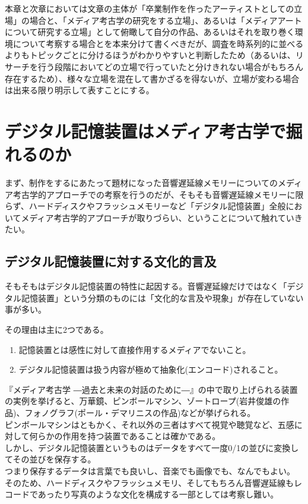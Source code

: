 \documentclass[a4paper,report]{jsbook}
\begin{document}
本章と次章においては文章の主体が「卒業制作を作ったアーティストとしての立場」の場合と、「メディア考古学の研究をする立場」、あるいは「メディアアートについて研究する立場」として俯瞰して自分の作品、あるいはそれを取り巻く環境について考察する場合とを本来分けて書くべきだが、調査を時系列的に並べるよりもトピックごとに分けるほうがわかりやすいと判断したため（あるいは、リサーチを行う段階においてどの立場で行っていたと分けきれない場合がもちろん存在するため）、様々な立場を混在して書かざるを得ないが、立場が変わる場合は出来る限り明示して表すことにする。

\section{デジタル記憶装置はメディア考古学で掘れるのか}\label{ux30c7ux30b8ux30bfux30ebux8a18ux61b6ux88c5ux7f6eux306fux30e1ux30c7ux30a3ux30a2ux8003ux53e4ux5b66ux3067ux6398ux308cux308bux306eux304b}

まず、制作をするにあたって題材になった音響遅延線メモリーについてのメディア考古学的アプローチでの考察を行うのだが、そもそも音響遅延線メモリーに限らず、ハードディスクやフラッシュメモリーなど「デジタル記憶装置」全般においてメディア考古学的アプローチが取りづらい、ということについて触れていきたい。

\subsection{デジタル記憶装置に対する文化的言及}\label{ux30c7ux30b8ux30bfux30ebux8a18ux61b6ux88c5ux7f6eux306bux5bfeux3059ux308bux6587ux5316ux7684ux8a00ux53ca}

そもそもはデジタル記憶装置の特性に起因する。音響遅延線だけではなく「デジタル記憶装置」という分類のものには「文化的な言及や現象」が存在していない事が多い。

その理由は主に2つである。

\begin{enumerate}
\def\labelenumi{\arabic{enumi}.}
\tightlist
\item
  記憶装置とは感性に対して直接作用するメディアでないこと。
\item
  デジタル記憶装置は扱う内容が極めて抽象化(エンコード)されること。
\end{enumerate}

『メディア考古学
―過去と未来の対話のために―』の中で取り上げられる装置の実例を挙げると、万華鏡、ピンボールマシン、ゾートロープ(岩井俊雄の作品)、フォノグラフ(ポール・デマリニスの作品)などが挙げられる。\\
ピンボールマシンはともかく、それ以外の三者はすべて視覚や聴覚など、五感に対して何らかの作用を持つ装置であることは確かである。\\
しかし、デジタル記憶装置というものはデータをすべて一度0/1の並びに変換してその並びを保存する。\\
つまり保存するデータは言葉でも良いし、音楽でも画像でも、なんでもよい。\\
そのため、ハードディスクやフラッシュメモリ、そしてもちろん音響遅延線もレコードであったり写真のような文化を構成する一部としては考察し難い。
\end{document}
